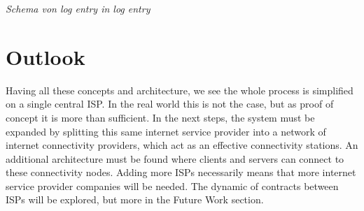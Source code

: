 \textit{Schema von log entry in log entry}


\section{Outlook}
Having all these concepts and architecture, we see the whole process is simplified on a single central ISP. In the real world this is not the case, but as proof of concept it is more than sufficient. In the next steps, the system must be expanded by splitting this same internet service provider into a network of internet connectivity providers, which act as an effective connectivity stations. An additional architecture must be found where clients and servers can connect to these connectivity nodes. Adding more ISPs necessarily means that more internet service provider companies will be needed. The dynamic of contracts between ISPs will be explored, but more in the Future Work section.